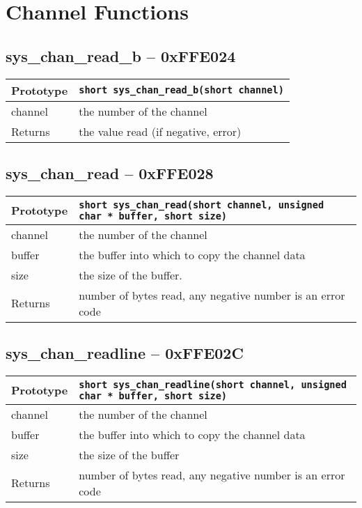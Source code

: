 \section{Channel Functions}

\subsection*{sys\_chan\_read\_b -- 0xFFE024}
\begin{tabular}{|l||l|} \hline
Prototype & \lstinline!short sys_chan_read_b(short channel)! \\ \hline
channel & the number of the channel \\ \hline
Returns & the value read (if negative, error) \\ \hline
\end{tabular}

\subsection*{sys\_chan\_read -- 0xFFE028}
\begin{tabular}{|l||l|} \hline
Prototype & \lstinline!short sys_chan_read(short channel, unsigned char * buffer, short size)! \\ \hline
channel & the number of the channel \\ \hline
buffer & the buffer into which to copy the channel data \\ \hline
size & the size of the buffer. \\ \hline
Returns & number of bytes read, any negative number is an error code \\ \hline
\end{tabular}

\subsection*{sys\_chan\_readline -- 0xFFE02C}
\begin{tabular}{|l||l|} \hline
Prototype & \lstinline!short sys_chan_readline(short channel, unsigned char * buffer, short size)! \\ \hline
channel & the number of the channel \\ \hline
buffer & the buffer into which to copy the channel data \\ \hline
size & the size of the buffer \\ \hline
Returns & number of bytes read, any negative number is an error code \\ \hline
\end{tabular}

